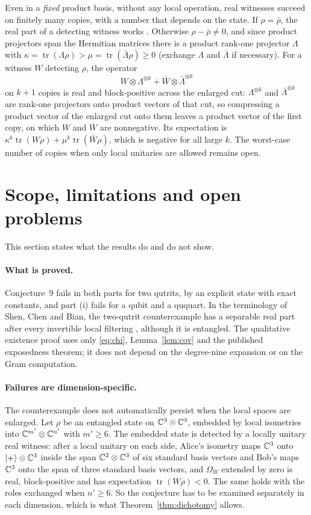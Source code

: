 \documentclass[11pt,a4paper]{article}
\theoremstyle{definition}\newtheorem{definition}[theorem]{Definition}\newtheorem*{conj}{Conjecture 9 of Shen, Chen and Bian}\newtheorem{remark}[theorem]{Remark}
\newcommand{\tr}{\operatorname{tr}}\newcommand{\im}{\operatorname{Im}}\newcommand{\adj}{\operatorname{adj}}\newcommand{\id}{\mathbb I}
\begin{document}
Even in a \emph{fixed} product basis, without any local operation, real witnesses succeed on finitely many copies, with a number that depends on the state. If $\rho=\bar\rho$, the real part of a detecting witness works \cite[Theorem 8]{shen}. Otherwise $\rho-\bar\rho\neq0$, and since product projectors span the Hermitian matrices there is a product rank-one projector $\Lambda$ with $\kappa=\tr(\Lambda\rho)>\mu=\tr(\bar\Lambda\rho)\geq0$ (exchange $\Lambda$ and $\bar\Lambda$ if necessary). For a witness $W$ detecting $\rho$, the operator
\[
 W\otimes \Lambda^{\otimes k}+\bar W\otimes\bar\Lambda^{\otimes k}
\]
on $k+1$ copies is real and block-positive across the enlarged cut: $\Lambda^{\otimes k}$ and $\bar\Lambda^{\otimes k}$ are rank-one projectors onto product vectors of that cut, so compressing a product vector of the enlarged cut onto them leaves a product vector of the first copy, on which $W$ and $\bar W$ are nonnegative. Its expectation is $\kappa^k\tr(W\rho)+\mu^k\tr(\bar W\rho)$, which is negative for all large $k$. The worst-case number of copies when only local unitaries are allowed remains open.

\section{Scope, limitations and open problems}\label{sec:scope}
This section states what the results do and do not show.

\paragraph{What is proved.} Conjecture~9 fails in both parts for two qutrits, by an explicit state with exact constants, and part (i) fails for a qubit and a ququart. In the terminology of Shen, Chen and Bian, the two-qutrit counterexample has a separable real part after every invertible local filtering \cite[SLOCC version of Lemma 10(ii)]{shen}, although it is entangled. The qualitative existence proof uses only \eqref{eq:chi}, Lemma~\ref{lem:cov} and the published exposedness theorem; it does not depend on the degree-nine expansion or on the Gram computation.

\paragraph{Failures are dimension-specific.} The counterexample does not automatically persist when the local spaces are enlarged. Let $\rho$ be an entangled state on $\mathbb C^3\otimes\mathbb C^3$, embedded by local isometries into $\mathbb C^{m'}\otimes\mathbb C^{n'}$ with $m'\geq6$. The embedded state is detected by a locally unitary real witness: after a local unitary on each side, Alice's isometry maps $\mathbb C^3$ onto $\lvert +\rangle\otimes\mathbb C^3$ inside the span $\mathbb C^2\otimes\mathbb C^3$ of six standard basis vectors and Bob's maps $\mathbb C^3$ onto the span of three standard basis vectors, and $\Omega_W$ extended by zero is real, block-positive and has expectation $\tr(W\rho)<0$. The same holds with the roles exchanged when $n'\geq6$. So the conjecture has to be examined separately in each dimension, which is what Theorem~\ref{thm:dichotomy} allows.
\end{document}
